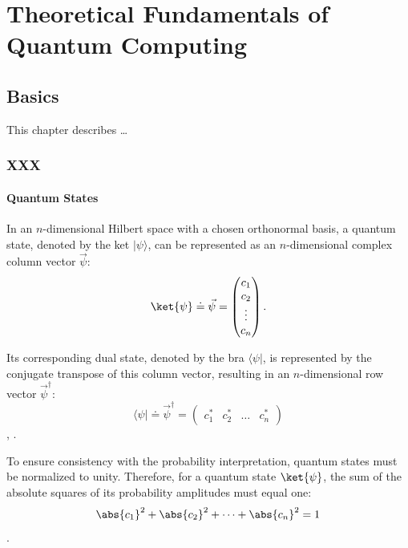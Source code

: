 \chapter{Theoretical Fundamentals of Quantum Computing}
\label{c:content}



\section{Basics} %
This chapter describes \dots

\subsection{XXX}

\subsubsection{Quantum States}
In an $n$-dimensional Hilbert space with a chosen orthonormal basis, a quantum state, denoted by the ket $|\psi\rangle$, can be represented as an $n$-dimensional complex column vector $\vec{\psi}$:
\begin{equation}
    \ket{\psi} \doteq \vec{\psi} = \begin{pmatrix}
                                       c_1 \\ c_2 \\ \vdots \\ c_n
    \end{pmatrix}.
\end{equation}

Its corresponding dual state, denoted by the bra $\langle\psi|$, is represented by the conjugate transpose of this column vector, resulting in an $n$-dimensional row vector $\vec{\psi}^\dagger$:
\begin{equation}
    \langle\psi| \doteq \vec{\psi}^\dagger = \begin{pmatrix}
                                                 c_1^* & c_2^* & \dots & c_n^*
    \end{pmatrix}
\end{equation}
\cite[p.16f.]{Kottmann2025}, \cite[p. 10f.]{sakurai2020modern}.

To ensure consistency with the probability interpretation, quantum states must be normalized to unity. Therefore, for a quantum state $\ket{\psi}$, the sum of the absolute squares of its probability amplitudes must equal one:
\begin{equation}
    \abs{c_1}^2 +\abs{c_2}^2 + \dots + \abs{c_n}^2 = 1
\end{equation}
\cite[p.5]{Kottmann2025}.

